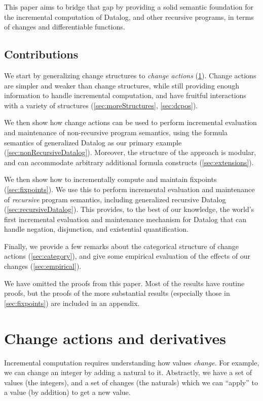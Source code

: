 This paper aims to bridge that gap by providing a solid semantic foundation for the incremental
computation of Datalog, and other recursive programs, in terms of changes and
differentiable functions.

\subsection{Contributions}

We start by generalizing change structures to
\emph{change actions} (\cref{sec:changeActions}). Change actions are simpler and weaker than change
structures, while still providing enough information to handle incremental
computation, and have fruitful
interactions with a variety of structures (\cref{sec:moreStructures}, \cref{sec:dcpos}).

We then show how change actions can be used to perform incremental evaluation and maintenance
of non-recursive program semantics, using the formula semantics of generalized Datalog as our primary
example (\cref{sec:nonRecursiveDatalog}). Moreover, the structure of the
approach is modular, and can accommodate arbitrary additional
formula constructs (\cref{sec:extensions}).

We then show how to incrementally compute and maintain fixpoints
(\cref{sec:fixpoints}). We use this to perform incremental evaluation and
maintenance of \emph{recursive} program semantics, including generalized
recursive Datalog (\cref{sec:recursiveDatalog}). This provides, to the best
of our knowledge, the world's first incremental
evaluation and maintenance mechanism for Datalog that can handle negation,
disjunction, and existential quantification. 

Finally, we provide a few remarks about the categorical structure of change
actions (\cref{sec:category}), and give some empirical evaluation of the effects
of our changes (\cref{sec:empirical}).

We have omitted the proofs from this paper. Most of the results have routine
proofs, but the proofs of the more substantial results
(especially those in \cref{sec:fixpoints}) are included in an appendix.

\section{Change actions and derivatives}
\label{sec:changeActions}

Incremental computation requires understanding how values \emph{change}. For
example, we can change an integer by adding a natural to it.
Abstractly, we have a set of values (the integers), and a set of changes
(the naturals) which we can ``apply'' to a value (by addition) to get a new value.

